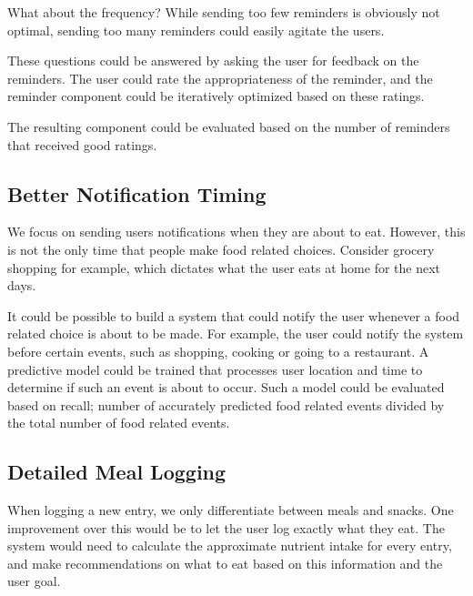 What about the frequency?
While sending too few reminders is obviously not optimal, 
sending too many reminders could easily agitate the users.

These questions could be answered by asking the user for feedback on the reminders.
The user could rate the appropriateness of the reminder,
and the reminder component could be iteratively optimized based on these ratings.

The resulting component could be evaluated based on the number of reminders that received good ratings.

\subsection{Better Notification Timing}
We focus on sending users notifications when they are about to eat.
However, this is not the only time that people make food related choices.
Consider grocery shopping for example, which dictates what the user eats at home for the next days.

It could be possible to build a system that could notify the user whenever a food related choice is about to be made.
For example, the user could notify the system before certain events, such as shopping, cooking or going to a restaurant.
A predictive model could be trained that processes user location and time to determine if such an event is about to occur. 
Such a model could be evaluated based on recall; number of accurately predicted food related events divided by the total number of food related events.

\subsection{Detailed Meal Logging}
When logging a new entry, we only differentiate between meals and snacks.
One improvement over this would be to let the user log exactly what they eat.
The system would need to calculate the approximate nutrient intake for every entry,
and make recommendations on what to eat based on this information and the user goal.

